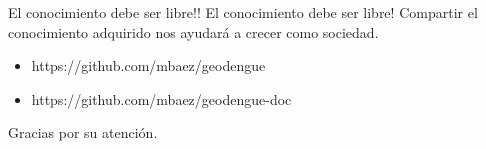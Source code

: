 
\begin{frame}[t]{El conocimiento debe ser libre!!}
    El conocimiento debe ser libre! Compartir el conocimiento adquirido nos ayudará a crecer como sociedad.
    \begin{center}
    \begin{itemize}
        \item https://github.com/mbaez/geodengue
        \item https://github.com/mbaez/geodengue-doc
    \end{itemize}
    \end{center}
\end{frame}


\begin{frame}[c]{}
    \begin{center}
    Gracias por su atención.
    \end{center}
\end{frame}
